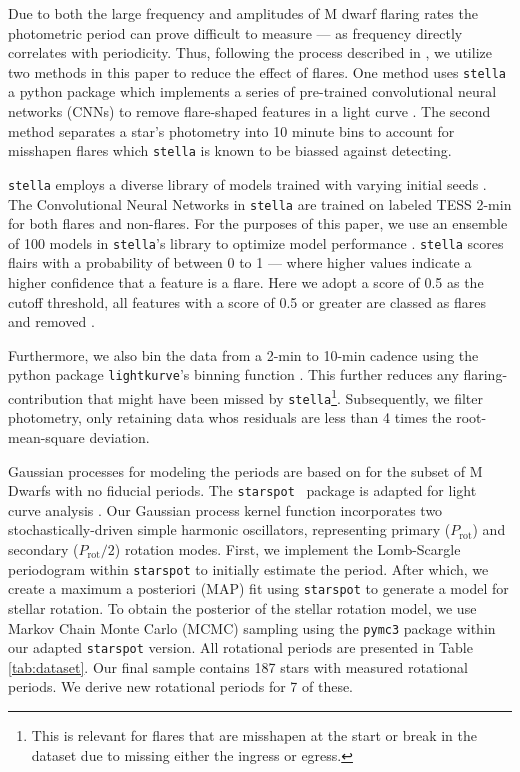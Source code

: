 Due to both the large frequency and amplitudes of M dwarf flaring rates the
photometric period can prove difficult to measure --- as frequency directly
correlates with periodicity. Thus, following the process described in
\citet{2023AJ....165..192G}, we utilize two methods in this paper to reduce the
effect of flares. One method uses \texttt{stella} a python package which
implements a series of pre-trained convolutional neural networks (CNNs) to
remove flare-shaped features in a light curve \citep{FeinsteinStella2020}. The
second method separates a star's photometry into 10 minute bins to account for
misshapen flares which \texttt{stella} is known to be biassed against detecting.

\texttt{stella}  employs a diverse library of models trained with varying
initial seeds \citep{FeinsteinFlare2020,FeinsteinStella2020}. The Convolutional
Neural Networks in \texttt{stella} are trained on labeled TESS 2-min for both
flares and non-flares. For the purposes of this paper, we use an ensemble of
100 models in \texttt{stella}'s library to optimize model performance
\citep[][for further detail]{FeinsteinFlare2020}. \texttt{stella} scores
flairs with a probability of between 0 to 1 --- where higher values indicate a
higher confidence that a feature is a flare. Here we adopt a score of 0.5 as
the cutoff threshold, all features with a score of 0.5 or greater are classed
as flares and removed \citep[e.g.][]{FeinsteinFlare2020}.

Furthermore, we also bin the data from a 2-min to 10-min cadence using the
python package \texttt{lightkurve}'s binning function
\citep{LightkurveCollaborationLightkurve2018,GeertBarentsenKeplerGO2020}. This
further reduces any flaring-contribution that might have been missed by
\texttt{stella}\footnote{This is relevant for flares that are misshapen at the
start or break in the dataset due to missing either the ingress or egress.}.
Subsequently, we filter photometry, only retaining data whos residuals are
less than 4 times the root-mean-square deviation.  

Gaussian processes for modeling the periods are based on
\citet{AngusInferring2018} for the subset of M Dwarfs with no fiducial periods.
The \texttt{starspot} \ package is adapted for light curve analysis
\citep{AngusRuthAngus2021, Angus2023}. Our Gaussian process kernel function
incorporates two stochastically-driven simple harmonic oscillators,
representing primary ($P_\textrm{rot}$) and secondary ($P_\textrm{rot}/2$)
rotation modes. First, we implement the Lomb-Scargle periodogram within
\texttt{starspot} to initially estimate the period. After which, we create a
maximum a posteriori (MAP) fit using \texttt{starspot} to generate a model for
stellar rotation. To obtain the posterior of the stellar rotation model, we use
Markov Chain Monte Carlo (MCMC) sampling using the \texttt{pymc3} package
\citep{SalvatierProbabilistic2016} within our adapted \texttt{starspot}
version. All rotational periods are presented in Table \ref{tab:dataset}. Our
final sample contains 187 stars with measured rotational periods. We derive new
rotational periods for 7 of these. 

